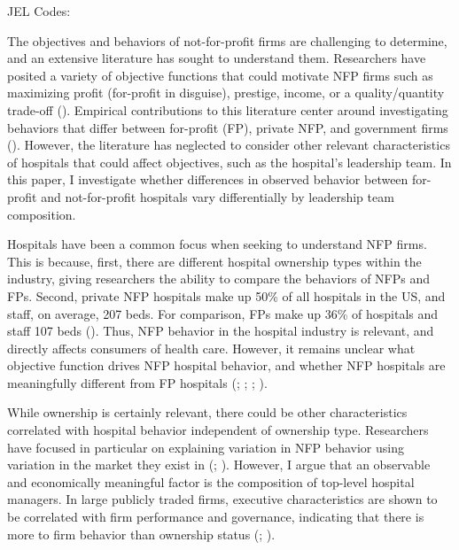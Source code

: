 \documentclass[12pt]{article}
\begin{document}
	\noindent JEL Codes: 
	
	\onehalfspacing
	
	\newpage

  The objectives and behaviors of not-for-profit firms are challenging to determine, and an extensive literature has sought to understand them. Researchers have posited a variety of objective functions that could motivate NFP firms such as maximizing profit (for-profit in disguise), prestige, income, or a quality/quantity trade-off (\cite{steinberg1986revealed}). Empirical contributions to this literature center around investigating behaviors that differ between for-profit (FP), private NFP, and government firms (\cite{sloan2000not}). However, the literature has neglected to consider other relevant characteristics of hospitals that could affect objectives, such as the hospital's leadership team. In this paper, I investigate whether differences in observed behavior between for-profit and not-for-profit hospitals vary differentially by leadership team composition. 
  
  Hospitals have been a common focus when seeking to understand NFP firms. This is because, first, there are different hospital ownership types within the industry, giving researchers the ability to compare the behaviors of NFPs and FPs. Second, private NFP hospitals make up 50\% of all hospitals in the US, and staff, on average, 207 beds. For comparison, FPs make up 36\% of hospitals and staff 107 beds (\cite{ASPE_2023}). Thus, NFP behavior in the hospital industry is relevant, and directly affects consumers of health care. However, it remains unclear what objective function drives NFP hospital behavior, and whether NFP hospitals are meaningfully different from FP hospitals (\cite{sloan2000not}; \cite{erus2002inferring}; \cite{deneffe2002not}; \cite{horwitz2009hospital}). 
  
  While ownership is certainly relevant, there could be other characteristics correlated with hospital behavior independent of ownership type. Researchers have focused in particular on explaining variation in NFP behavior using variation in the market they exist in (\cite{duggan2002hospital}; \cite{horwitz2009hospital}). However, I argue that an observable and economically meaningful factor is the composition of top-level hospital managers. In large publicly traded firms, executive characteristics are shown to be correlated with firm performance and governance, indicating that there is more to firm behavior than ownership status (\cite{bertrand2003managing}; \cite{ahern2012changing}\cite{matsa2013female}). 
  
\end{document}
